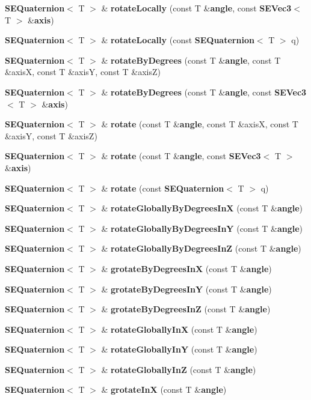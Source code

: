 \begin{DoxyCompactItemize}
\item 
{\bf S\+E\+Quaternion}$<$ T $>$ \& {\bf rotate\+Locally} (const T \&{\bf angle}, const {\bf S\+E\+Vec3}$<$ T $>$ \&{\bf axis})
\item 
{\bf S\+E\+Quaternion}$<$ T $>$ \& {\bf rotate\+Locally} (const {\bf S\+E\+Quaternion}$<$ T $>$ q)
\item 
{\bf S\+E\+Quaternion}$<$ T $>$ \& {\bf rotate\+By\+Degrees} (const T \&{\bf angle}, const T \&axis\+X, const T \&axis\+Y, const T \&axis\+Z)
\item 
{\bf S\+E\+Quaternion}$<$ T $>$ \& {\bf rotate\+By\+Degrees} (const T \&{\bf angle}, const {\bf S\+E\+Vec3}$<$ T $>$ \&{\bf axis})
\item 
{\bf S\+E\+Quaternion}$<$ T $>$ \& {\bf rotate} (const T \&{\bf angle}, const T \&axis\+X, const T \&axis\+Y, const T \&axis\+Z)
\item 
{\bf S\+E\+Quaternion}$<$ T $>$ \& {\bf rotate} (const T \&{\bf angle}, const {\bf S\+E\+Vec3}$<$ T $>$ \&{\bf axis})
\item 
{\bf S\+E\+Quaternion}$<$ T $>$ \& {\bf rotate} (const {\bf S\+E\+Quaternion}$<$ T $>$ q)
\item 
{\bf S\+E\+Quaternion}$<$ T $>$ \& {\bf rotate\+Globally\+By\+Degrees\+In\+X} (const T \&{\bf angle})
\item 
{\bf S\+E\+Quaternion}$<$ T $>$ \& {\bf rotate\+Globally\+By\+Degrees\+In\+Y} (const T \&{\bf angle})
\item 
{\bf S\+E\+Quaternion}$<$ T $>$ \& {\bf rotate\+Globally\+By\+Degrees\+In\+Z} (const T \&{\bf angle})
\item 
{\bf S\+E\+Quaternion}$<$ T $>$ \& {\bf grotate\+By\+Degrees\+In\+X} (const T \&{\bf angle})
\item 
{\bf S\+E\+Quaternion}$<$ T $>$ \& {\bf grotate\+By\+Degrees\+In\+Y} (const T \&{\bf angle})
\item 
{\bf S\+E\+Quaternion}$<$ T $>$ \& {\bf grotate\+By\+Degrees\+In\+Z} (const T \&{\bf angle})
\item 
{\bf S\+E\+Quaternion}$<$ T $>$ \& {\bf rotate\+Globally\+In\+X} (const T \&{\bf angle})
\item 
{\bf S\+E\+Quaternion}$<$ T $>$ \& {\bf rotate\+Globally\+In\+Y} (const T \&{\bf angle})
\item 
{\bf S\+E\+Quaternion}$<$ T $>$ \& {\bf rotate\+Globally\+In\+Z} (const T \&{\bf angle})
\item 
{\bf S\+E\+Quaternion}$<$ T $>$ \& {\bf grotate\+In\+X} (const T \&{\bf angle})
\item 

\end{DoxyCompactItemize}
